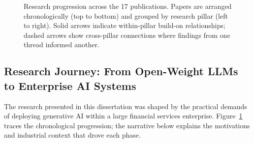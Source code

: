 \begin{figure}
\caption{Research progression across the 17 publications.  Papers are arranged
chronologically (top to bottom) and grouped by research pillar (left to right).
Solid arrows indicate within-pillar build-on relationships; dashed arrows show
cross-pillar connections where findings from one thread informed another.}
\label{fig:research_progression}
\end{figure}

\subsection{Research Journey: From Open-Weight LLMs to Enterprise AI Systems}
\label{sec:research_journey}

The research presented in this dissertation was shaped by the practical demands of deploying generative AI within a large financial services enterprise.  Figure~\ref{fig:research_progression} traces the chronological progression; the narrative below explains the motivations and industrial context that drove each phase.

